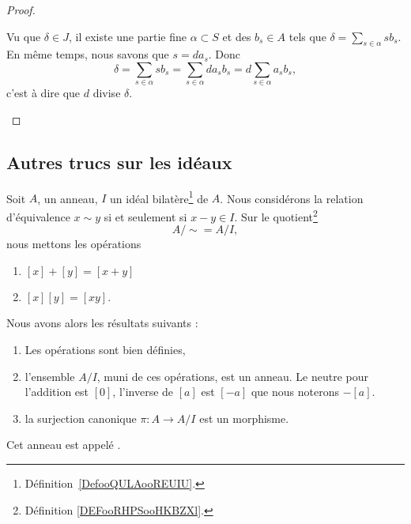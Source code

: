\begin{proof}
\begin{subproof}
\begin{subproof}
			Vu que \( \delta\in J\), il existe une partie fine \( \alpha\subset S\) et des \( b_s\in A\) tels que \( \delta=\sum_{s\in \alpha}sb_s\). En même temps, nous savons que \( s=da_s\). Donc
			\begin{equation}
				\delta=\sum_{s\in \alpha}sb_s=\sum_{s\in \alpha}da_sb_s=d\sum_{s\in \alpha}a_sb_s,
			\end{equation}
			c'est à dire que \( d\) divise \( \delta\).
		\end{subproof}
	\end{subproof}
\end{proof}

\subsection{Autres trucs sur les idéaux}


\begin{propositionDef}      \label{PROPooGXMRooTcUGbi}
	Soit \( A\), un anneau, \( I\) un idéal bilatère\footnote{Définition~\ref{DefooQULAooREUIU}.} de \( A\). Nous considérons la relation d'équivalence \( x\sim y\) si et seulement si \( x-y\in I\). Sur le quotient\footnote{Définition \ref{DEFooRHPSooHKBZXl}.}
	\begin{equation}
		A/\sim=A/I,
	\end{equation}
	nous mettons les opérations
	\begin{enumerate}
		\item
		      \( [x]+[y]=[x+y]\)
		\item
		      \( [x][y]=[xy]\).
	\end{enumerate}
	Nous avons alors les résultats suivants :
	\begin{enumerate}
		\item       \label{ITEMooEJPEooRKAqmS}
		      Les opérations sont bien définies,
		\item       \label{ITEMooYBEGooTlHgNz}
		      l'ensemble \( A/I\), muni de ces opérations, est un anneau. Le neutre pour l'addition est \( [0]\), l'inverse de \( [a]\) est \( [-a]\) que nous noterons \( -[a]\).
		\item       \label{ITEMooLNRLooMkoWXZ}
		      la surjection canonique \( \pi\colon A\to A/I\) est un morphisme.
	\end{enumerate}
	Cet anneau est appelé .
\end{propositionDef}


